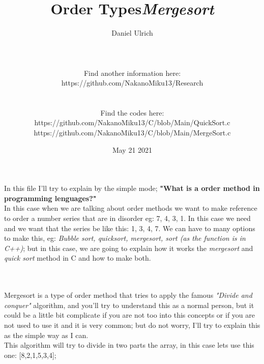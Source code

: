 \documentclass[12pt, letterpaper]{article}
\title{Order Types}
\author{Daniel Ulrich
\\
\\
\\
\\
Find another information here:
\\
https://github.com/NakanoMiku13/Research
\\
\\
\\
Find the codes here:
\\
https://github.com/NakanoMiku13/C/blob/Main/QuickSort.c
\\
https://github.com/NakanoMiku13/C/blob/Main/MergeSort.c
\\
}
\date{May 21 2021}
\begin{document}
\maketitle
\newpage
In this file I'll try to explain by the simple mode; \textbf{"What is a order method in programming lenguages?"}
\\ 
In this case when we are talking about order methods we want to make reference to order a number series that are in disorder eg: 7, 4, 3, 1. In this case we need and we want that the series be like this: 1, 3, 4, 7. 
We can have to many options to make this, eg: \textit{Bubble sort, quicksort, mergesort, sort (as the function is in C++)}; but in this case, we are going to explain how it works the \textit{mergesort} and \textit{quick sort} method in C and how to make both.
\\
\\
\title{\textbf{\textit{Mergesort}}}\\
Mergesort is a type of order method that tries to apply the famous \textit{"Divide and conquer"} algorithm, and you'll try to understand this as a normal person, but it could be a little bit complicate if you are not too into this concepts or if you are not used to use it and it is very common; but do not worry, I'll try to explain this as the simple way as I can.
\\
This algorithm will try to divide in two parts the array, in this case lets use this one: [8,2,1,5,3,4];
\end{document}
